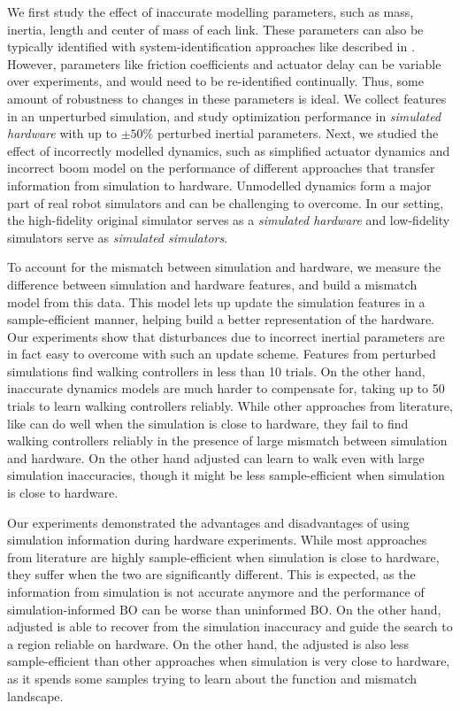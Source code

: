 We first study the effect of inaccurate modelling parameters, such as mass, inertia, length and center of mass of each link. These parameters can also be typically identified with system-identification approaches like described in \cite{An:1988:MCR:47324}. However, parameters like friction coefficients and actuator delay can be variable over experiments, and would need to be re-identified continually. Thus, some amount of robustness to changes in these parameters is ideal. We collect features in an unperturbed simulation, and study optimization performance in \textit{simulated hardware} with up to $\pm50\%$ perturbed inertial parameters. Next, we studied the effect of incorrectly modelled dynamics, such as simplified actuator dynamics and incorrect boom model on the performance of different approaches that transfer information from simulation to hardware. Unmodelled dynamics form a major part of real robot simulators and can be challenging to overcome. In our setting, the high-fidelity original simulator serves as a \textit{simulated hardware} and low-fidelity simulators serve as \textit{simulated simulators}.

To account for the mismatch between simulation and hardware, we measure the difference between simulation and hardware features, and build a mismatch model from this data. This model lets up update the simulation features in a sample-efficient manner, helping build a better representation of the hardware. Our experiments show that disturbances due to incorrect inertial parameters are in fact easy to overcome with such an update scheme. Features from perturbed simulations find walking controllers in less than 10 trials. On the other hand, inaccurate dynamics models are much harder to compensate for, taking up to 50 trials to learn walking controllers reliably. While other approaches from literature, like \cite{cully2015robots} can do well when the simulation is close to hardware, they fail to find walking controllers reliably in the presence of large mismatch between simulation and hardware. On the other hand adjusted \dogkernel can learn to walk even with large simulation inaccuracies, though it might be less sample-efficient when simulation is close to hardware.

Our experiments demonstrated the advantages and disadvantages of using simulation information during hardware experiments. While most approaches from literature are highly sample-efficient when simulation is close to hardware, they suffer when the two are significantly different. This is expected, as the information from simulation is not accurate anymore and the performance of simulation-informed BO can be worse than uninformed BO. On the other hand, adjusted \dogkernel is able to recover from the simulation inaccuracy and guide the search to a region reliable on hardware. On the other hand, the adjusted \dogkernel is also less sample-efficient than other approaches when simulation is very close to hardware, as it spends some samples trying to learn about the function and mismatch landscape.

